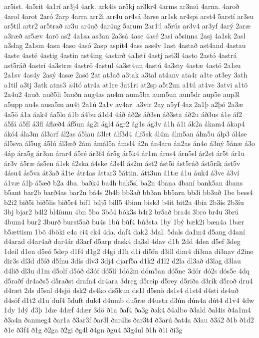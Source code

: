 {ar5ist.
4a5rit
4a1rí
ar3j4
4ark.
ark4is
ar5kj
ar3kr4
4arms
ar3mú
4arna.
4aroð
4arol
4arot
2aró
2arp
4arra
arr2i
arr4u
ar4sá
3arse
ar1sk
ar4spi
arst4
5arstí
ar3su
ar5til
artr2
ar5trað
ar3u
ar4uð
4ar4ug
5arum
2ar1ú
a5rús
ar3v4
ar3yf
4arý
2aræ
a3ræð
ar5æv
4arö
as2
4a1sa
as3an
2a3sá
4ase
4asé
2asi
a5sinna
2asj
4a1sk
2asl
a3slag
2a1sm
4asn
4aso
4asó
2asp
aspít4
4ass
ass4v
1ast
4astað
ast4and
4astau
4aste
4asté
4astig
4astin
ast4ing
4astirð
4a1stí
4astj
ast3l
4asto
2astó
4astrá
ast5ráð
4astrí
4a3stræ
4aströ
4astul
4a3st4un
4astú
4a3sty
4astæ
4astö
2a1su
2a1sv
4as4y
2asý
4asæ
2asö
2at
at3að
a3tak
a3tal
at4anv
ata4r
a1te
at3ey
3ath
a1til
a3tj
3atk
atns3
a4tó
atr4a
at1re
3at1ri
at2sp
a5t2un
a1tú
at4ve
3atvi
a1tö
2a4u2
4auð.
auð5li
5auðn
aug4as
au4m
aum5ba
aum5un
aun5dr
aup5e
aup3l
a5upp
au4s
ausa5m
au4t
2a1ú
2a1v
av4ar.
a3vir
2ay
a5yf
4az
2a1þ
a2þó
2a3æ
4a5ö
á1a
áak4
áa5lo
á1b
á4bu
á1d4
4áð
áð2s
áð3sn
áð3sta
áð2u
áð3us
á1e
áf2
á5fá
á5fí
á3fl
áflæð4
áf5un
ág2i
ágl4
ágr2
ág1s
ág3v
á1h
á1i
ák2a
ákam4
ákap4
ákó4
ála3m
ál3arf
ál2as
á5lau
á3let
álf3d4
álf5sk
ál4m
álm5an
álm5u
álp3
ál4se
ál5sva
ál5ug
á5lú
ál3æð
2ám
ámál5a
ámsl4
á2n
án4aro
án2as
án4o
á3ný
5ánæ
á3o
4áp
ára5g
ár3an
árar4
á5ré
ár3f4
ár5g
ár5k4
ár1m
árns4
árn5sl
ár2st
ár5t
ár1u
ár3v
á5ræ
ás5en
á1sk
á2ska
á4ske
á3s4l
ás2m
ást2
ást5i
ást5ráð
ást5rík
ást5v
4ásu4
ás5va
át3að
á1te
átr4as
áttar3
5áttin.
átt3un
á1tæ
á1u
áuk4
á3ve
á3ví
á1væ
á1þ
á5æð
b2a
4ba.
baðk4
ba4h
bak5sl
ba2n
4bana
4baní
bank5an
4bans
b5ant
bar2b
barð4as
bar2n
bá4s
2b4b
bb3að
bb3an
bb5arn
bb3i
bb3uð
1be
bess4
b2i2
bið5i
bið5lis
bið5r4
bif1
bilj5
bill5
4binn
bisk3
b4it
bit2a
4bía
2b3ís
2b3íu
3bj
bjar2
b4l2
bl4íunn
4bn
5bo
3bó4
bók3s
b4r2
br5að
bra4s
3bro
br4u
3brú
4bum4
bur2
3burð
burst5að
bu4s
1bú
búf4
bú3sta
1by
1bý
bæk2i
bæn4a
1bær
b5ættism
1bö
4böki
c4a
ci4
ck4
4da.
daf4
dak2
3dal.
5dals
da1m4
d5ang
d4aní
d4arad
d4ar4að
dar4ár
d3arf
d5arp
dask4
da3sl
4dav
d1b
2dd
4dea
d5ef
3deg
1deil
d1en
d5eó
5dep
d1f4
d1g2
d4gi
d1h
d1i
di5fu
d3ill
dim4
di3ma
di3nav
d2ine
dir3s
dí3d
d5íð
d5ínu
3dís
dív3
3dj4
djarf5a
d1k2
d1l2
d2la
dl3að
d3lag
d3lau
d4lið
dl3u
d1m
d5olf
d5óð
d3óf
dó5lí
1dó2m
dóm5an
dó5ne
3dór
dó2s
dós5e
4dq
d5raðf
dr4aðs5
d5raðst
drafn4
dr4ara
3dreg
d5reip
d5rey
d5riða
d3rík
d5roð
dru4
d4ræt
2ds
d5sal
d4sjö
dsk2
ds4ko
ds5kun
ds1l
d5snö
ds1s4
d1st4
d4sti
ds4uð
d4söf
d1t2
d1u
duf4
5duft
duk4
d4umb
du5ræ
d4usta
d3ún
dún4a
dút4
d1v4
4dw
1dy
1dý
d3þ
1dæ
4dæf
4dær
3dö
ð1a
ðaf4
ða3g
ðak4
ð4albo
ð3ald
ðal4is
ð4a1m4
ð3a4n
ðanmeg4
ðar1a
ð3ar3f
ðar3l
ðar4lis
ðar3t4
ð3arú
ðat4a
ð3au
ð3á2
ð1b
ð1d2
ð1e
ð3f4
ð1g
ð2ga
ð2gi
ðg4l
ð4gn
ðgu4
ð3g4ul
ð1h
ð1i
ði3g
}
